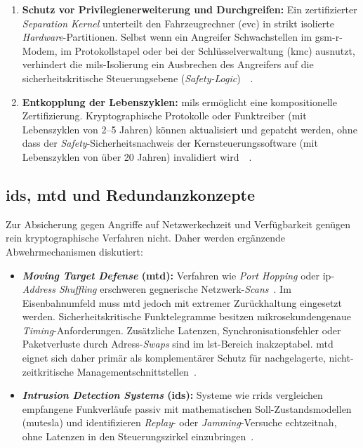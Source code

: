 \documentclass[runningheads]{res/llncs}
\begin{document}
\begin{enumerate}
    \item \textbf{Schutz vor Privilegienerweiterung und Durchgreifen:} Ein zertifizierter \textit{Separation Kernel} unterteilt den Fahrzeugrechner (\gls{evc}) in strikt isolierte \textit{Hardware}-Partitionen. Selbst wenn ein Angreifer Schwachstellen im \gls{gsm-r}-Modem, im Protokollstapel oder bei der Schlüsselverwaltung (\gls{kmc}) ausnutzt, verhindert die \gls{mils}-Isolierung ein Ausbrechen des Angreifers auf die sicherheitskritische Steuerungsebene (\textit{Safety-Logic})~\parencite[S. 32--34]{schulzIntegration2019}~\parencite[S. 80--81]{tverdyshevCertMILS2019}.
    \item \textbf{Entkopplung der Lebenszyklen:} \gls{mils} ermöglicht eine kompositionelle Zertifizierung. Kryptographische Protokolle oder Funktreiber (mit Lebenszyklen von 2--5 Jahren) können aktualisiert und gepatcht werden, ohne dass der \textit{Safety}-Sicherheitsnachweis der Kernsteuerungssoftware (mit Lebenszyklen von über 20 Jahren) invalidiert wird~\parencite[S. 31, 35]{schulzIntegration2019}~\parencite[S. 83]{tverdyshevCertMILS2019}.
\end{enumerate}

\subsection{\texorpdfstring{\gls{ids}, \gls{mtd} und Redundanzkonzepte}{IDS, MTD und Redundanzkonzepte}}
\label{sec:IDS_MTD_und_Redundanzkonzepte}
Zur Absicherung gegen Angriffe auf Netzwerkechzeit und Verfügbarkeit genügen rein kryptographische Verfahren nicht. Daher werden ergänzende Abwehrmechanismen diskutiert:

\begin{itemize}
    \item \textbf{\textit{Moving Target Defense} (\gls{mtd}):} Verfahren wie \textit{Port Hopping} oder \gls{ip}-\textit{Address Shuffling} erschweren gegnerische Netzwerk-\textit{Scans}~\parencite[S. 121]{poschingerOpenMTD2020}. Im Eisenbahnumfeld muss \gls{mtd} jedoch mit extremer Zurückhaltung eingesetzt werden. Sicherheitskritische Funktelegramme besitzen mikrosekundengenaue \textit{Timing}-Anforderungen. Zusätzliche Latenzen, Synchronisationsfehler oder Paketverluste durch Adress-\textit{Swaps} sind im \gls{lst}-Bereich inakzeptabel. \gls{mtd} eignet sich daher primär als komplementärer Schutz für nachgelagerte, nicht-zeitkritische Managementschnittstellen~\parencite[S. 121]{poschingerOpenMTD2020}.
    \item \textbf{\textit{Intrusion Detection Systems} (\gls{ids}):} Systeme wie \gls{rrids} vergleichen empfangene Funkverläufe passiv mit mathematischen Soll-Zustandsmodellen (\gls{mutesla}) und identifizieren \textit{Replay}- oder \textit{Jamming}-Versuche echtzeitnah, ohne Latenzen in den Steuerungszirkel einzubringen~\parencite[S. 60--63]{melaragnoRail2016}.
\end{itemize}
\end{document}
